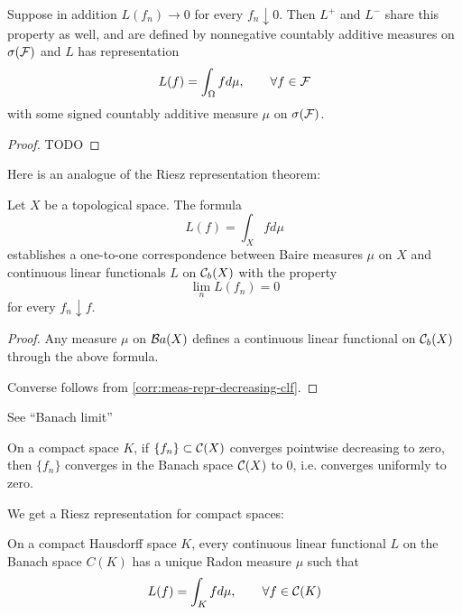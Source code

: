 \begin{corollary}
  \label{corr:meas-repr-decreasing-clf}
  Suppose in addition $L(f_n) \to 0$ for every
  $f_n \downarrow 0$. Then $L^+$ and $L^-$
  share this property as well, and are defined by nonnegative
  countably additive measures on $\sigma(\mathcal{F})$
  and $L$ has representation
  \[
    L(f) = \int_\Omega f d\mu, \qquad \forall f \in \mathcal{F}
  \]
  with some signed countably additive measure $\mu$ on $\sigma(\mathcal{F})$.
\end{corollary}

\begin{proof}
  TODO
\end{proof}

Here is an analogue of the Riesz representation theorem:

\begin{theorem}
  \label{thm:baire-meas-repr-clf}
  Let $X$ be a topological space. The formula
  \[
    L(f) = \int_X f d\mu
  \]
  establishes a one-to-one correspondence between Baire measures $\mu$
  on $X$ and continuous linear functionals $L$ on $\mathcal{C}_b(X)$ with
  the property
  \[
    \lim_n L(f_n) = 0
  \]
  for every $f_n \downarrow f$.
\end{theorem}

\begin{proof}
  Any measure $\mu$ on $\mathcal{B}a(X)$ defines a continuous linear functional
  on $\mathcal{C}_b(X)$ through the above formula.

  Converse follows from \cref{corr:meas-repr-decreasing-clf}.
\end{proof}

See ``Banach limit''

\begin{theorem}
  \label{thm:dini}
  On a compact space $K$,
  if $\{f_n\} \subset \mathcal{C}(X)$ converges pointwise decreasing to zero,
  then $\{f_n\}$ converges in the Banach space $\mathcal{C}(X)$ to $0$, i.e.
  converges uniformly to zero.
\end{theorem}

We get a Riesz representation for compact spaces:

\begin{theorem}
  On a compact Hausdorff space $K$,
  every continuous linear functional $L$
  on the Banach space $C(K)$ has a unique
  Radon measure $\mu$ such that
  \begin{align*}
    L(f) = \int_K f d\mu, \qquad \forall f \in \mathcal{C}(K)
  \end{align*}
\end{theorem}

